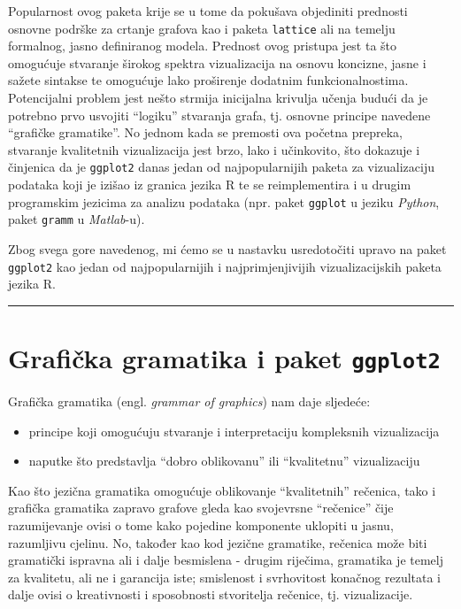 \documentclass[]{book}
\providecommand{\tightlist}{%
  \setlength{\itemsep}{0pt}\setlength{\parskip}{0pt}}
\theoremstyle{definition}
\theoremstyle{definition}
\theoremstyle{definition}
\theoremstyle{remark}
\begin{document}
Popularnost ovog paketa krije se u tome da pokušava objediniti prednosti
osnovne podrške za crtanje grafova kao i paketa \texttt{lattice} ali na
temelju formalnog, jasno definiranog modela. Prednost ovog pristupa jest
ta što omogućuje stvaranje širokog spektra vizualizacija na osnovu
koncizne, jasne i sažete sintakse te omogućuje lako proširenje dodatnim
funkcionalnostima. Potencijalni problem jest nešto strmija inicijalna
krivulja učenja budući da je potrebno prvo usvojiti ``logiku'' stvaranja
grafa, tj. osnovne principe navedene ``grafičke gramatike''. No jednom
kada se premosti ova početna prepreka, stvaranje kvalitetnih
vizualizacija jest brzo, lako i učinkovito, što dokazuje i činjenica da
je \texttt{ggplot2} danas jedan od najpopularnijih paketa za
vizualizaciju podataka koji je izišao iz granica jezika R te se
reimplementira i u drugim programskim jezicima za analizu podataka (npr.
paket \texttt{ggplot} u jeziku \emph{Python}, paket \texttt{gramm} u
\emph{Matlab}-u).

Zbog svega gore navedenog, mi ćemo se u nastavku usredotočiti upravo na
paket \texttt{ggplot2} kao jedan od najpopularnijih i najprimjenjivijih
vizualizacijskih paketa jezika R.

\begin{center}\rule{0.5\linewidth}{\linethickness}\end{center}

\section{\texorpdfstring{Grafička gramatika i paket
\texttt{ggplot2}}{Grafička gramatika i paket ggplot2}}\label{graficka-gramatika-i-paket-ggplot2}

Grafička gramatika (engl. \emph{grammar of graphics}) nam daje sljedeće:

\begin{itemize}
\tightlist
\item
  principe koji omogućuju stvaranje i interpretaciju kompleksnih
  vizualizacija
\item
  naputke što predstavlja ``dobro oblikovanu'' ili ``kvalitetnu''
  vizualizaciju
\end{itemize}

Kao što jezična gramatika omogućuje oblikovanje ``kvalitetnih''
rečenica, tako i grafička gramatika zapravo grafove gleda kao svojevrsne
``rečenice'' čije razumijevanje ovisi o tome kako pojedine komponente
uklopiti u jasnu, razumljivu cjelinu. No, također kao kod jezične
gramatike, rečenica može biti gramatički ispravna ali i dalje besmislena
- drugim riječima, gramatika je temelj za kvalitetu, ali ne i garancija
iste; smislenost i svrhovitost konačnog rezultata i dalje ovisi o
kreativnosti i sposobnosti stvoritelja rečenice, tj. vizualizacije.
\end{document}

